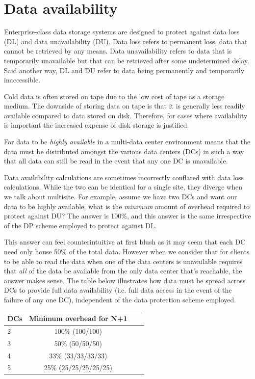 \section{Data availability}

Enterprise-class data storage systems are designed to protect against data loss (DL) and data unavailability (DU). Data loss refers to permanent loss, data that cannot be retrieved by any means. Data unavailability refers to data that is temporarily unavailable but that can be retrieved after some undetermined delay. Said another way, DL and DU refer to data being permanently and temporarily inaccessible.

Cold data is often stored on tape due to the low cost of tape as a storage medium. The downside of storing data on tape is that it is generally less readily available compared to data stored on disk. Therefore, for cases where availability is important the increased expense of disk storage is justified. 

For data to be \emph{highly available} in a multi-data center environment means that the data must be distributed amongst the various data centers (DCs) in such a way that all data can still be read in the event that any one DC is unavailable. 

Data availability calculations are sometimes incorrectly conflated with data loss calculations. While the two can be identical for a single site, they diverge when we talk about multisite. For example, assume we have two DCs and want our data to be highly available, what is the \emph{minimum} amount of overhead required to protect against DU? The answer is 100\%, and this answer is the same irrespective of the DP scheme employed to protect against DL.

This answer can feel counterintuitive at first blush as it may seem that each DC need only house 50\% of the total data. However when we consider that for clients to be able to read the data when one of the data centers is unavailable requires that \emph{all} of the data be available from the only data center that's reachable, the answer makes sense. The table below illustrates how data must be spread across DCs to provide full data availability (i.e. full data access in the event of the failure of any one DC), independent of the data protection scheme employed. 
 
\begin{tabular}{l*{2}{c}l}
DCs & Minimum overhead for N+1 \\
\hline
2 & 100\% (100/100) \\
3 & 50\% (50/50/50) \\
4 & 33\% (33/33/33/33) \\
5 & 25\% (25/25/25/25/25) \\
\end{tabular}

